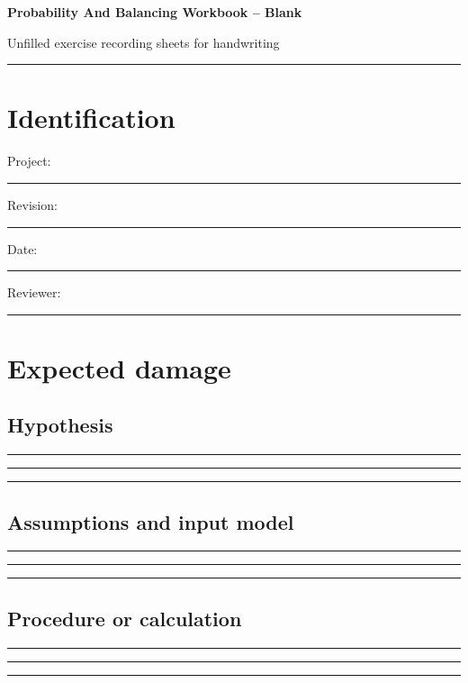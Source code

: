 \documentclass[11pt]{article}
\begin{document}
{\huge\bfseries\color{suiteblue} Probability And Balancing Workbook -- Blank}\par
\vspace{0.15in}
{\normalsize\color{suitegray} Unfilled exercise recording sheets for handwriting}\par
\vspace{0.15in}\hrule\vspace{0.15in}

\section{Identification}
Project: \rule{0.70\linewidth}{0.4pt}\par\vspace{0.25in}
Revision: \rule{0.36\linewidth}{0.4pt}\hfill Date: \rule{0.26\linewidth}{0.4pt}\par\vspace{0.25in}
Reviewer: \rule{0.67\linewidth}{0.4pt}\par
\clearpage

\section{Expected damage}

\subsection{Hypothesis}
\noindent\rule{\linewidth}{0.35pt}\par\vspace{0.22in}
\noindent\rule{\linewidth}{0.35pt}\par\vspace{0.22in}
\noindent\rule{\linewidth}{0.35pt}\par\vspace{0.18in}

\subsection{Assumptions and input model}
\noindent\rule{\linewidth}{0.35pt}\par\vspace{0.22in}
\noindent\rule{\linewidth}{0.35pt}\par\vspace{0.22in}
\noindent\rule{\linewidth}{0.35pt}\par\vspace{0.18in}

\subsection{Procedure or calculation}
\noindent\rule{\linewidth}{0.35pt}\par\vspace{0.22in}
\noindent\rule{\linewidth}{0.35pt}\par\vspace{0.22in}
\noindent\rule{\linewidth}{0.35pt}\par\vspace{0.18in}
\end{document}
